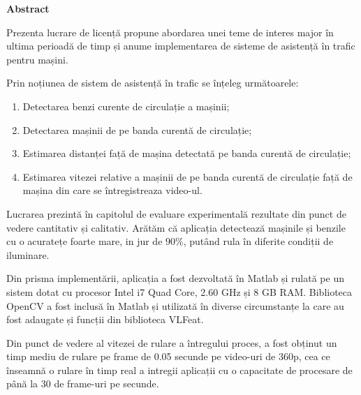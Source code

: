 \thispagestyle{plain}

\begin{center}
	\Large \textbf{Abstract}	
\end{center}

Prezenta lucrare de licență propune abordarea unei teme de interes major în ultima perioadă de timp și anume implementarea de sisteme de asistență în trafic pentru mașini. 

Prin noțiunea de sistem de asistență în trafic se înțeleg următoarele:
\begin{enumerate}
	\item Detectarea benzi curente de circulație a mașinii;
	\item Detectarea mașinii de pe banda curentă de circulație;
	\item Estimarea distanței față de mașina detectată pe banda curentă de circulație;
	\item Estimarea vitezei relative a mașinii de pe banda curentă de circulație față de mașina din care se întregistreaza video-ul.
\end{enumerate}

Lucrarea prezintă în capitolul de evaluare experimentală rezultate din punct de vedere cantitativ și calitativ. Arătăm că aplicația detectează mașinile și benzile cu o acuratețe foarte mare, in jur de $90\%$, putând rula în diferite condiții de iluminare.

Din prisma implementării, aplicația a fost dezvoltată în Matlab și rulată pe un sistem dotat cu procesor Intel i7 Quad Core, 2.60 GHz și 8 GB RAM. Biblioteca OpenCV a fost inclusă în Matlab și utilizată în diverse circumstanțe la care au fost adaugate și funcții din biblioteca VLFeat.

Din punct de vedere al vitezei de rulare a întregului proces, a fost obținut un timp mediu de rulare pe frame de 0.05 secunde pe video-uri de 360p, cea ce înseamnă o rulare în timp real a intregii aplicații cu o capacitate de procesare de până la 30 de frame-uri pe secunde.  
\vspace*{\fill}